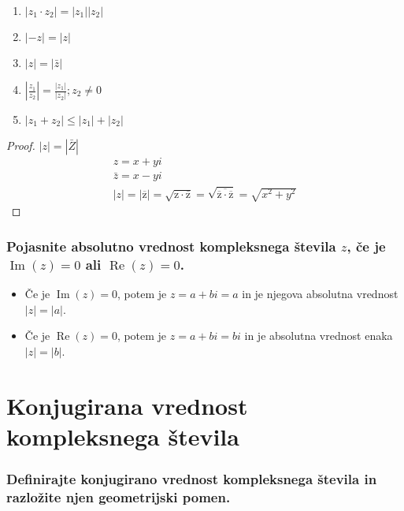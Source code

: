\documentclass{article}
\begin{document}
\begin{enumerate}
  \item $\left|z_{1} \cdot z_{2}\right|=\left|z_{1}\right|\left|z_{2}\right|$

  \item $|-z|=|z|$

  \item $|z|=|\bar{z}|$

  \item $\left|\frac{z_{1}}{z_{2}}\right|=\frac{\left|z_{1}\right|}{\left|z_{2}\right|} ; z_{2} \neq 0$

  \item $\left|z_{1}+z_{2}\right| \leq\left|z_{1}\right|+\left|z_{2}\right|$

\end{enumerate}

\begin{proof}
    $|z|=|\bar{Z}|$
    \begin{gather*}
        z=x+y i \\
        \bar{z}=x-y i \\
        |z|=|\overline{\mathrm{z}}|=\sqrt{\mathrm{z} \cdot \overline{\mathrm{z}}}=\sqrt{\overline{\overline{\mathrm{z}} \cdot \overline{\mathrm{z}}}}=\sqrt{x^{2}+y^{2}}
    \end{gather*}
\end{proof}
\subsubsection*{Pojasnite absolutno vrednost kompleksnega števila $z$, če je $\operatorname{Im}(z)=0$ ali $\operatorname{Re}(z)=0$.} 
\begin{itemize}
  \item Če je $\operatorname{Im}(z)=0$, potem je $z=a+b i=a$ in je njegova absolutna vrednost $|z|=|a|$.
  \item Če je $\operatorname{Re}(z)=0$, potem je $z=a+b i=b i$ in je absolutna vrednost enaka $|z|=|b|$.
\end{itemize}

\section{Konjugirana vrednost kompleksnega števila}
\subsubsection*{Definirajte konjugirano vrednost kompleksnega števila in razložite njen geometrijski pomen.}
\end{document}
